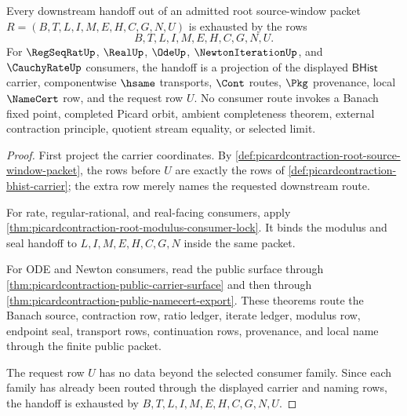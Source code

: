 \begin{theorem}
\label{thm:picardcontraction-root-downstream-handoff-exhaustion}
Every downstream handoff out of an admitted root source-window packet
$R=(B,T,L,I,M,E,H,C,G,N,U)$ is exhausted by the rows
$$
B,T,L,I,M,E,H,C,G,N,U.
$$
For $\RegSeqRatUp$, $\RealUp$, $\OdeUp$, $\NewtonIterationUp$, and
$\CauchyRateUp$ consumers, the handoff is a projection of the displayed
$\mathsf{BHist}$ carrier, componentwise $\hsame$ transports, $\Cont$ routes,
$\Pkg$ provenance, local $\NameCert$ row, and the request row $U$. No consumer
route invokes a Banach fixed point, completed Picard orbit, ambient
completeness theorem, external contraction principle, quotient stream
equality, or selected limit.
\end{theorem}
\begin{proof}
First project the carrier coordinates. By
\autoref{def:picardcontraction-root-source-window-packet}, the rows before
$U$ are exactly the rows of \autoref{def:picardcontraction-bhist-carrier}; the
extra row merely names the requested downstream route.

For rate, regular-rational, and real-facing consumers, apply
\autoref{thm:picardcontraction-root-modulus-consumer-lock}. It binds the
modulus and seal handoff to $L,I,M,E,H,C,G,N$ inside the same packet.

For ODE and Newton consumers, read the public surface through
\autoref{thm:picardcontraction-public-carrier-surface} and then through
\autoref{thm:picardcontraction-public-namecert-export}. These theorems route
the Banach source, contraction row, ratio ledger, iterate ledger, modulus row,
endpoint seal, transport rows, continuation rows, provenance, and local name
through the finite public packet.

The request row $U$ has no data beyond the selected consumer family. Since
each family has already been routed through the displayed carrier and naming
rows, the handoff is exhausted by $B,T,L,I,M,E,H,C,G,N,U$.
\end{proof}

